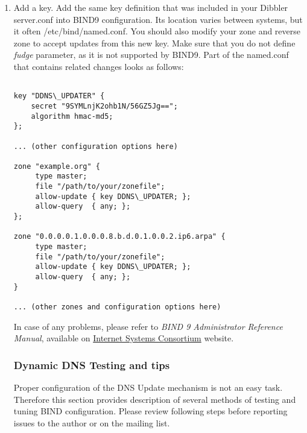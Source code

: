 \begin{enumerate}
\item Add a key. Add the same key definition that was included in your
Dibbler server.conf into BIND9 configuration. Its location varies
between systems, but it often /etc/bind/named.conf. You should also
modify your zone and reverse zone to accept updates from this new
key. Make sure that you do not define \emph{fudge} parameter, as it is
not supported by BIND9. Part of the named.conf that contains related
changes looks as follows:

\begin{lstlisting}

key "DDNS\_UPDATER" {
    secret "9SYMLnjK2ohb1N/56GZ5Jg==";
    algorithm hmac-md5;
};

... (other configuration options here)

zone "example.org" {
     type master;
     file "/path/to/your/zonefile";
     allow-update { key DDNS\_UPDATER; };
     allow-query  { any; };
};

zone "0.0.0.0.1.0.0.0.8.b.d.0.1.0.0.2.ip6.arpa" {
     type master;
     file "/path/to/your/zonefile";
     allow-update { key DDNS\_UPDATER; };
     allow-query  { any; };
}

... (other zones and configuration options here)
\end{lstlisting}

In case of any problems, please refer to \emph{BIND 9 Administrator
Reference Manual}, available
on \href{http://www.isc.org/software/bind}{Internet Systems
Consortium} website.

\subsubsection{Dynamic DNS Testing and tips}
Proper configuration of the DNS Update mechanism is not an easy
task. Therefore this section provides description of several methods of
testing and tuning BIND configuration. Please review following steps
before reporting issues to the author or on the mailing list.


\end{enumerate}
